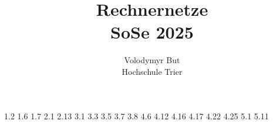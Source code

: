 \documentclass[10pt, oneside]{article}
\title{Rechnernetze\\[10pt]\Large{SoSe 2025}}
\author{Volodymyr But\\[10pt]Hochschule Trier}
\date{}
\begin{document}
\maketitle
\vspace{25px}

{1.2}
{1.6}
{1.7}
{2.1}
{2.13}
{3.1}
\pagebreak
{3.3}
{3.5}
\pagebreak
{3.7}
{3.8}
{4.6}
{4.12}
{4.16}
{4.17}
{4.22}
{4.25}
\setcounter{figure}{0}
{5.1}
{5.11}
\end{document}
